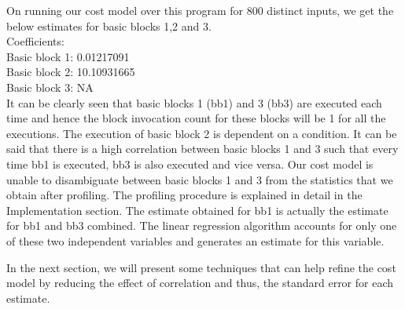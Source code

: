 On running our cost model over this program for 800 distinct inputs, we get the below estimates for basic blocks 1,2 and 3.\\

Coefficients:\\
Basic block 1: 0.01217091\\
Basic block 2: 10.10931665\\
Basic block 3: NA\\

It can be clearly seen that basic blocks 1 (bb1) and 3 (bb3) are executed each time and hence the block invocation count for these blocks will be 1 for all the executions. The execution of basic block 2 is dependent on a condition. It can be said that there is a high correlation between basic blocks 1 and 3 such that every time bb1 is executed, bb3 is also executed and vice versa. Our cost model is unable to disambiguate between basic blocks 1 and 3 from the statistics that we obtain after profiling. The profiling procedure is explained in detail in the Implementation section. The estimate obtained for bb1 is actually the estimate for bb1 and bb3 combined. The linear regression algorithm accounts for only one of these two independent variables and generates an estimate for this variable.\newline 

In the next section, we will present some techniques that can help refine the cost model by reducing the effect of correlation and thus, the standard error for each estimate.
